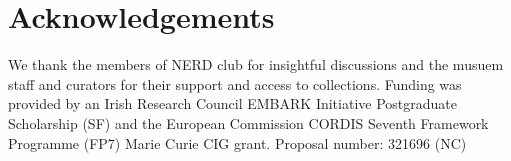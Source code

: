 \documentclass[12pt,a4paper]{article}
\begin{document}
\section*{Acknowledgements}


We thank the members of NERD club for insightful discussions and the musuem staff and curators for their support and access to collections. Funding was provided by an Irish Research Council EMBARK Initiative Postgraduate Scholarship (SF) and the European Commission CORDIS Seventh Framework Programme (FP7) Marie Curie CIG grant. Proposal number: 321696 (NC)






\end{document}

